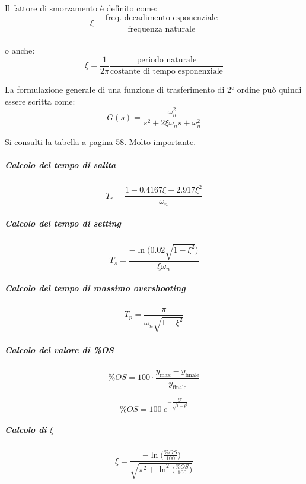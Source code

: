 \documentclass[11pt]{article}
\begin{document}
Il fattore di smorzamento è definito come: \begin{equation}
\xi = \frac{\text{freq. decadimento esponenziale}}{\text{frequenza naturale}}
\end{equation}\\
o anche:\\
\begin{equation}
\xi = \frac{1}{2 \pi} \frac{\text{periodo naturale}}{\text{costante di tempo esponenziale}}
\end{equation}

    La formulazione generale di una funzione di trasferimento di 2° ordine
può quindi essere scritta come:\\
\begin{equation}
    G(s) = \frac{\omega^2_n}{s^2 + 2 \xi \omega_n s + \omega_n^2}
\end{equation}

    Si consulti la tabella a pagina 58. Molto importante.

    \hypertarget{calcolo-del-tempo-di-salita}{%
\subparagraph{Calcolo del tempo di
salita}\label{calcolo-del-tempo-di-salita}}

\begin{equation}
T_r = \frac{1 - 0.4167 \xi + 2.917 \xi^2}{\omega_n}
\end{equation}

\hypertarget{calcolo-del-tempo-di-setting}{%
\subparagraph{Calcolo del tempo di
setting}\label{calcolo-del-tempo-di-setting}}

\begin{equation}
T_s = \frac{- \ln\big(0.02 \sqrt{1-\xi^2}\big)}{\xi \omega_n}
\end{equation}

\hypertarget{calcolo-del-tempo-di-massimo-overshooting}{%
\subparagraph{Calcolo del tempo di massimo
overshooting}\label{calcolo-del-tempo-di-massimo-overshooting}}

\begin{equation}
T_p = \frac{\pi}{\omega_n \sqrt{1-\xi^2}}
\end{equation}

\hypertarget{calcolo-del-valore-di-os}{%
\subparagraph{Calcolo del valore di
\%OS}\label{calcolo-del-valore-di-os}}

\begin{equation}
\%OS = 100 \cdot \frac{y_{\text{max}} - y_{\text{finale}}}{y_{\text{finale}}}
\end{equation}

\begin{equation}
\%OS = 100\ e^{-\frac{\xi \pi}{\sqrt{1-\xi^2}}}
\end{equation}

\hypertarget{calcolo-di-xi}{%
\subparagraph{\texorpdfstring{Calcolo di
\(\xi\)}{Calcolo di \textbackslash{}xi}}\label{calcolo-di-xi}}

\begin{equation}
\xi = \frac{- \ln\big(\frac{\%OS}{100}\big)}{\sqrt{\pi^2 + \ln^2\big(\frac{\%OS}{100}\big)}}
\end{equation}


    
    
    
    
\end{document}
